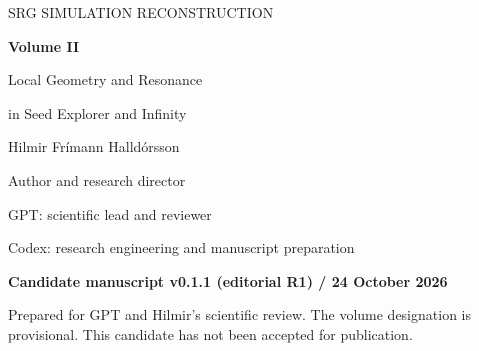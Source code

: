 \documentclass[11pt,a4paper]{article}
\begin{document}
\begin{titlepage}
\vspace*{12mm}
{\sffamily\large SRG SIMULATION RECONSTRUCTION\par}
\vspace{8mm}
{\huge\bfseries Volume II\par}
\vspace{5mm}
{\LARGE Local Geometry and Resonance\par}
\vspace{3mm}
{\LARGE in Seed Explorer and Infinity\par}
\vspace{12mm}
{\large Hilmir Frímann Halldórsson\par}
Author and research director\par
\vspace{4mm}
GPT: scientific lead and reviewer\par
Codex: research engineering and manuscript preparation\par
\vspace{10mm}
\textbf{Candidate manuscript v0.1.1 (editorial R1) / 24 October 2026}\par
Prepared for GPT and Hilmir's scientific review. The volume designation is provisional. This candidate has not been accepted for publication.\par
\vfill
\begin{abstract}
What did the original moving-point SRG programs actually calculate, and which aspects of their reported organization survive a source-and-record reconstruction? This volume explains Seed Explorer (SIM04) and Infinity (SIM05) as distinct discrete algorithms. Both combine geometry-dependent local averaging, scheduled resonance changes, a global weighted-center displacement and positional randomness. Infinity additionally evolves a second real amplitude field with asymmetric local mixing strengths and symmetric cross-channel terms. Stored velocities are displacement diagnostics in both programs.

Seed Explorer's original 21 saved states show contraction, narrowing amplitudes and separation of the local graph; a minimal six-point component becomes compact while occupying the lowest amplitude ranks. Its normalized three-dimensional geometry changes as it shrinks. Infinity's accepted 200-pass replay develops five compact groups of 11, 13, 10, 10 and 6 distinct points, with nearly uniform amplitudes inside each group and different levels between groups. All 4,000 historical aggregate metrics agree within the retained tolerance, supporting attribution without replacing the missing historical trajectory. The endpoint echo and candidate masks acquire exact interpretations in the replay. Four reviewed mathematical statements explain neighborhood size, normalized averaging, the fusion centroid and conditional two-field uniformity. The account separates historical observations, reproduced states and derivations; it establishes neither an infinite-time limit nor a physical identification of the fields. No simulation or scientific numerical verification was rerun for this manuscript.
\end{abstract}
\end{titlepage}
\tableofcontents
\clearpage
\end{document}
